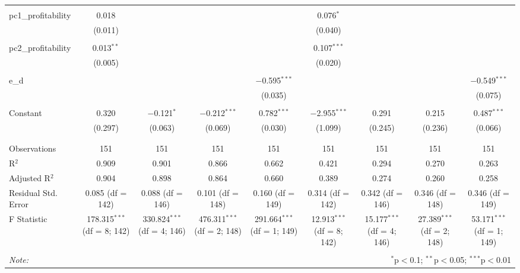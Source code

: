 \begin{table}[!htbp]
\begin{tabular}{@{\extracolsep{5pt}}lcccccccc}
  & & & & & & & & \\ 
 pc1\_profitability & 0.018 &  &  &  & 0.076$^{*}$ &  &  &  \\ 
  & (0.011) &  &  &  & (0.040) &  &  &  \\ 
  & & & & & & & & \\ 
 pc2\_profitability & 0.013$^{**}$ &  &  &  & 0.107$^{***}$ &  &  &  \\ 
  & (0.005) &  &  &  & (0.020) &  &  &  \\ 
  & & & & & & & & \\ 
 e\_d &  &  &  & $-$0.595$^{***}$ &  &  &  & $-$0.549$^{***}$ \\ 
  &  &  &  & (0.035) &  &  &  & (0.075) \\ 
  & & & & & & & & \\ 
 Constant & 0.320 & $-$0.121$^{*}$ & $-$0.212$^{***}$ & 0.782$^{***}$ & $-$2.955$^{***}$ & 0.291 & 0.215 & 0.487$^{***}$ \\ 
  & (0.297) & (0.063) & (0.069) & (0.030) & (1.099) & (0.245) & (0.236) & (0.066) \\ 
  & & & & & & & & \\ 
\hline \\[-1.8ex] 
Observations & 151 & 151 & 151 & 151 & 151 & 151 & 151 & 151 \\ 
R$^{2}$ & 0.909 & 0.901 & 0.866 & 0.662 & 0.421 & 0.294 & 0.270 & 0.263 \\ 
Adjusted R$^{2}$ & 0.904 & 0.898 & 0.864 & 0.660 & 0.389 & 0.274 & 0.260 & 0.258 \\ 
Residual Std. Error & 0.085 (df = 142) & 0.088 (df = 146) & 0.101 (df = 148) & 0.160 (df = 149) & 0.314 (df = 142) & 0.342 (df = 146) & 0.346 (df = 148) & 0.346 (df = 149) \\ 
F Statistic & 178.315$^{***}$ (df = 8; 142) & 330.824$^{***}$ (df = 4; 146) & 476.311$^{***}$ (df = 2; 148) & 291.664$^{***}$ (df = 1; 149) & 12.913$^{***}$ (df = 8; 142) & 15.177$^{***}$ (df = 4; 146) & 27.389$^{***}$ (df = 2; 148) & 53.171$^{***}$ (df = 1; 149) \\ 
\hline 
\hline \\[-1.8ex] 
\textit{Note:}  & \multicolumn{8}{r}{$^{*}$p$<$0.1; $^{**}$p$<$0.05; $^{***}$p$<$0.01} \\ 
\end{tabular} 
\end{table} 
